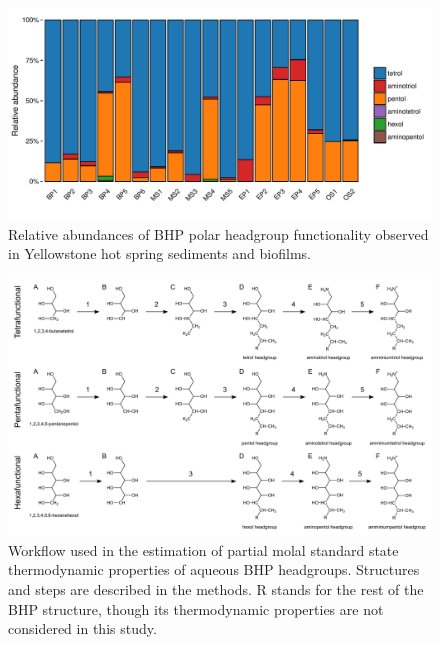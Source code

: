 \singlespace
\begin{figure}[h]
\centering
\includegraphics[width=1\linewidth]{figs_ch3/BHP_barchart.pdf}
\caption[Relative abundances of BHP polar headgroup functionality observed in Yellowstone hot spring sediments and biofilms]{Relative abundances of BHP polar headgroup functionality observed in Yellowstone hot spring sediments and biofilms.}
\label{fig:BHP_abund}
\end{figure}
\doublespace



\singlespace
\begin{figure}[h]
\centering
\includegraphics[width=1\linewidth]{figs_ch3/BHP_thermoest_paper.pdf}
\caption[Workflow used in the estimation of partial molal standard state thermodynamic properties of aqueous BHP headgroups]{Workflow used in the estimation of partial molal standard state thermodynamic properties of aqueous BHP headgroups. Structures and steps are described in the methods. R stands for the rest of the BHP structure, though its thermodynamic properties are not considered in this study.}
\label{fig:BHP_thermoest_paper}
\end{figure}
\doublespace


